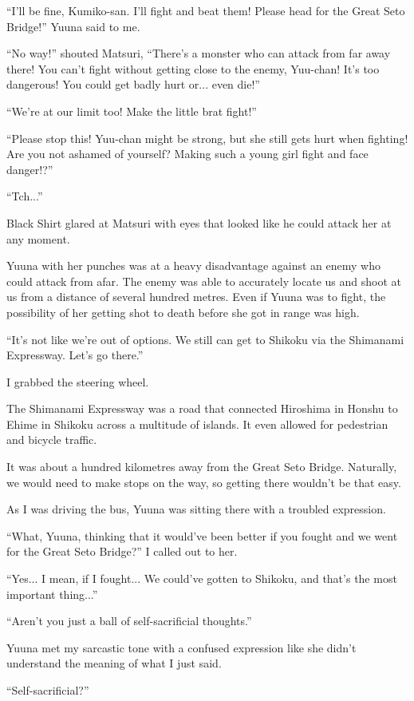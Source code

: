 ``I'll be fine, Kumiko-san. I'll fight and beat them! Please head for the Great Seto Bridge!'' Yuuna said to me.

``No way!'' shouted Matsuri, ``There's a monster who can attack from far away there! You can't fight without getting close to the enemy, Yuu-chan! It's too dangerous! You could get badly hurt or... even die!''

``We're at our limit too! Make the little brat fight!''

``Please stop this! Yuu-chan might be strong, but she still gets hurt when fighting! Are you not ashamed of yourself? Making such a young girl fight and face danger!?''

``Tch...''

Black Shirt glared at Matsuri with eyes that looked like he could attack her at any moment.

Yuuna with her punches was at a heavy disadvantage against an enemy who could attack from afar. The enemy was able to accurately locate us and shoot at us from a distance of several hundred metres. Even if Yuuna was to fight, the possibility of her getting shot to death before she got in range was high.

``It's not like we're out of options. We still can get to Shikoku via the Shimanami Expressway. Let's go there.''

I grabbed the steering wheel.

The Shimanami Expressway was a road that connected Hiroshima in Honshu to Ehime in Shikoku across a multitude of islands. It even allowed for pedestrian and bicycle traffic.

It was about a hundred kilometres away from the Great Seto Bridge. Naturally, we would need to make stops on the way, so getting there wouldn't be that easy.

As I was driving the bus, Yuuna was sitting there with a troubled expression.

``What, Yuuna, thinking that it would've been better if you fought and we went for the Great Seto Bridge?'' I called out to her.

``Yes... I mean, if I fought... We could've gotten to Shikoku, and that's the most important thing...''

``Aren't you just a ball of self-sacrificial thoughts.''

Yuuna met my sarcastic tone with a confused expression like she didn't understand the meaning of what I just said.

``Self-sacrificial?''

